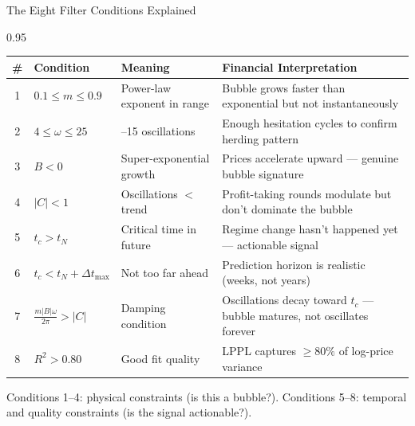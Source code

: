 \documentclass[9pt, aspectratio=169, t]{beamer}
\begin{document}
\begin{frame}{The Eight Filter Conditions Explained}
    \begin{cminipage}{0.95\textwidth}
    {\scriptsize
    \renewcommand{\arraystretch}{1.35}
    \begin{tabular}{c >{\raggedright\arraybackslash}p{2.8cm} >{\raggedright\arraybackslash}p{3.2cm} >{\raggedright\arraybackslash}p{4.0cm}}
        \toprule
        \textbf{\#} & \textbf{Condition} & \textbf{Meaning} & \textbf{Financial Interpretation} \\
        \midrule
        \rowcolor{MainBlue!8}
        1 & $0.1 \leq m \leq 0.9$ & Power-law exponent in range & Bubble grows faster than exponential but not instantaneously \\
        2 & $4 \leq \omega \leq 25$ & 2.5--15 oscillations & Enough hesitation cycles to confirm herding pattern \\
        \rowcolor{MainBlue!8}
        3 & $B < 0$ & Super-exponential growth & Prices accelerate upward --- genuine bubble signature \\
        4 & $|C| < 1$ & Oscillations $<$ trend & Profit-taking rounds modulate but don't dominate the bubble \\
        \midrule
        \rowcolor{Crimson!8}
        5 & $t_c > t_N$ & Critical time in future & Regime change hasn't happened yet --- actionable signal \\
        \rowcolor{Crimson!8}
        6 & $t_c < t_N + \Delta t_{\max}$ & Not too far ahead & Prediction horizon is realistic (weeks, not years) \\
        7 & $\frac{m|B|\omega}{2\pi} > |C|$ & Damping condition & Oscillations decay toward $t_c$ --- bubble matures, not oscillates forever \\
        \rowcolor{Crimson!8}
        8 & $R^2 > 0.80$ & Good fit quality & LPPL captures $\geq 80\%$ of log-price variance \\
        \bottomrule
    \end{tabular}
    }
    \vspace{2mm}
    {\scriptsize\textcolor{MediumGray}{Conditions 1--4: physical constraints (is this a bubble?). Conditions 5--8: temporal and quality constraints (is the signal actionable?).}}
    \end{cminipage}
\end{frame}
\end{document}

